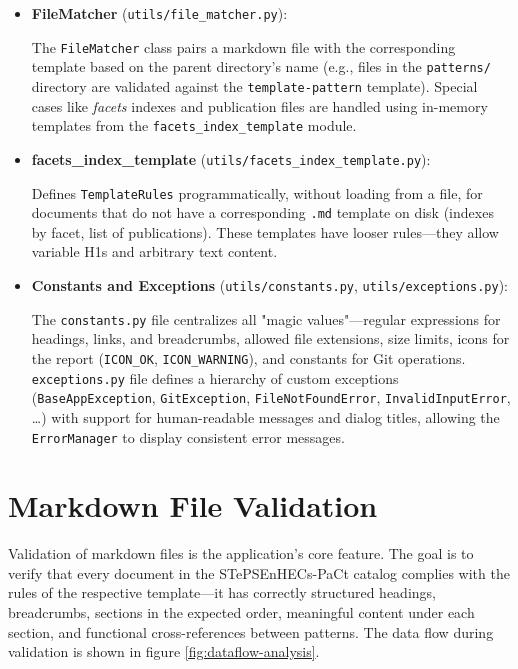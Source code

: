 \documentclass[12pt, a4paper]{article}
\begin{document}
\begin{itemize}
\begin{itemize}
        \item \textbf{FileMatcher} (\texttt{utils/file\_matcher.py}):

        The \texttt{FileMatcher} class pairs a markdown file with the corresponding template based on the parent 
        directory's name (e.g., files in the \texttt{patterns/} directory are validated against the 
        \texttt{template-pattern} template). Special cases like \emph{facets} indexes and publication 
        files are handled using in-memory templates from the \texttt{facets\_index\_template} module.

        \item \textbf{facets\_index\_template} (\texttt{utils/facets\_index\_template.py}):

        Defines \texttt{TemplateRules} programmatically, without loading from a file, for documents that 
        do not have a corresponding \texttt{.md} template on disk (indexes by facet, list of publications). 
        These templates have looser rules—they allow variable H1s and arbitrary text content.

        \item \textbf{Constants and Exceptions} (\texttt{utils/constants.py}, \texttt{utils/exceptions.py}):

        The \texttt{constants.py} file centralizes all "magic values"—regular expressions for headings, 
        links, and breadcrumbs, allowed file extensions, size limits, icons for the report (\texttt{ICON\_OK}, 
        \texttt{ICON\_WARNING}), and constants for Git operations. \texttt{exceptions.py} file defines a 
        hierarchy of custom exceptions (\texttt{BaseAppException}, \texttt{GitException}, \texttt{FileNotFoundError}, 
        \texttt{InvalidInputError}, \ldots) with support for human-readable messages and dialog titles, allowing the 
        \texttt{ErrorManager} to display consistent error messages.
    \end{itemize}
\end{itemize}

\section{Markdown File Validation}

Validation of markdown files is the application's core feature. 
The goal is to verify that every document in the STePSEnHECs-PaCt catalog complies 
with the rules of the respective template—it has correctly structured headings, breadcrumbs, 
sections in the expected order, meaningful content under each section, and functional 
cross-references between patterns. The data flow during validation is shown in figure \ref{fig:dataflow-analysis}.
\end{document}
